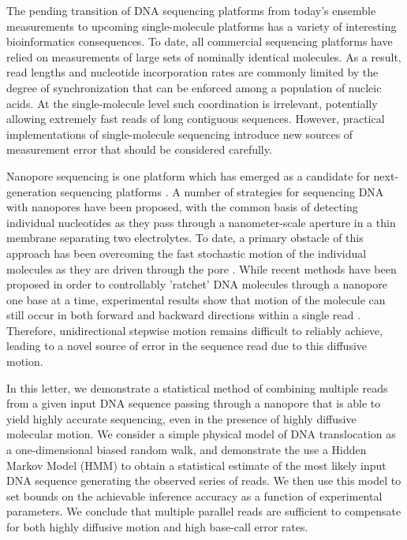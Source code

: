 \documentclass{biophys_letter}
\begin{document}
\vspace*{2.7pt}
\begin{multicols}{2}
The pending transition of DNA sequencing platforms from today's ensemble measurements to upcoming single-molecule platforms has a variety of interesting bioinformatics consequences.
To date, all commercial sequencing platforms have relied on measurements of large sets of nominally identical molecules.
As a result, read lengths and nucleotide incorporation rates are commonly limited by the degree of synchronization that can be enforced among a population of nucleic acids.
At the single-molecule level such coordination is irrelevant, potentially allowing extremely fast reads of long contiguous sequences.
However, practical implementations of single-molecule sequencing introduce new sources of measurement error that should be considered carefully.

Nanopore sequencing is one platform which has emerged as a candidate for next-generation sequencing platforms \cite{Branton:2008}.
A number of strategies for sequencing DNA with nanopores have been proposed, with the common basis of detecting individual nucleotides as they pass through a nanometer-scale aperture in a thin membrane separating two electrolytes.
To date, a primary obstacle of this approach has been overcoming the fast stochastic motion of the individual molecules as they are driven through the pore \cite{Venkatesan:2011, Lu:2011}.
While recent methods have been proposed in order to controllably 'ratchet' DNA molecules through a nanopore one base at a time, experimental results show that motion of the molecule can still occur in both forward and backward directions within a single read \cite{Luan:2011, Olasagasti:2010, Cherf:2012}.
Therefore, unidirectional stepwise motion remains difficult to reliably achieve, leading to a novel source of error in the sequence read due to this diffusive motion.

In this letter, we demonstrate a statistical method of combining multiple reads from a given input DNA sequence passing through a nanopore that is able to yield highly accurate sequencing, even in the presence of highly diffusive molecular motion.
We consider a simple physical model of DNA translocation as a one-dimensional biased random walk, and demonstrate the use a Hidden Markov Model (HMM) to obtain a statistical estimate of the most likely input DNA sequence generating the observed series of reads.
We then use this model to set bounds on the achievable inference accuracy as a function of experimental parameters.
We conclude that multiple parallel reads are sufficient to compensate for both highly diffusive motion and high base-call error rates.


\end{multicols}
\end{document}

